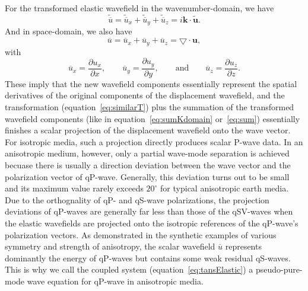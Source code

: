 For the transformed elastic wavefield in the wavenumber-domain, we have
\begin{equation}
\label{eq:sumKdomain}
\widetilde{\overline{u}} = \widetilde{\overline{u}}_x + \widetilde{\overline{u}}_y + \widetilde{\overline{u}}_z
             = i\mathbf{k}\cdot{\widetilde{\mathbf{u}}}.
\end{equation}
And in space-domain, we also have
\begin{equation}
\label{eq:sum}
\overline{u} = \overline{u}_x + \overline{u}_y + \overline{u}_z
             = \bigtriangledown\cdot{\mathbf{u}},
\end{equation}
with
\begin{equation}
\label{eq:Deriv}
\overline{u}_x = \frac{\partial u_x}{\partial x},\qquad \overline{u}_y = \frac{\partial u_y}{\partial y},\qquad \mbox{and} \qquad \overline{u}_z=\frac{\partial u_z}{\partial z}.
\end{equation}
These imply that the new wavefield components essentially represent the spatial derivatives of the original
components of the displacement wavefield, and the transformation (equation~\ref{eq:similarT})
plus the summation of the transformed wavefield components (like in equation~\ref{eq:sumKdomain} or~\ref{eq:sum})
essentially finishes a scalar projection of the displacement wavefield onto the wave vector. 
For isotropic media, such a projection directly produces scalar P-wave data. In an anisotropic medium,
 however, only a partial wave-mode separation is achieved becuase there is usually a direction deviation 
between the wave vector and the polarization vector of qP-wave.
Generally, this deviation turns out to be small and
its maximum value rarely exceeds $20^\circ$ for typical anisotropic earth media\mbox{\cite[]{psencik:1998}}.
Due to the orthognality of qP- and qS-wave polarizations, the projection deviations of qP-waves are generally
far less than those of the qSV-waves when the elastic wavefields are projected onto the isotropic references
of the qP-wave's polarization vectors.
As demonstrated in the synthetic examples of various symmetry and strength of anisotropy, 
	the scalar wavefield $\overline{u}$ represents dominantly
the energy of qP-waves but contains some weak residual qS-waves.
This is why we call the coupled system (equation~\ref{eq:tansElastic}) a pseudo-pure-mode wave equation
for qP-wave in anisotropic media.

